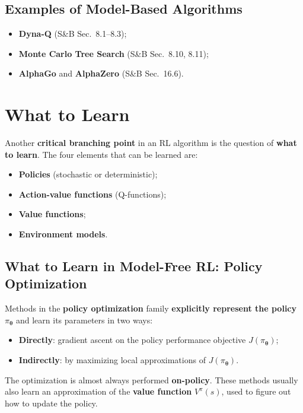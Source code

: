 \documentclass[11pt,a4paper]{article}
\theoremstyle{definition}
\theoremstyle{plain}
\theoremstyle{remark}
\begin{document}
\subsection{Examples of Model-Based Algorithms}

\begin{itemize}
    \item \textbf{Dyna-Q} (S\&B Sec.\ 8.1--8.3);
    \item \textbf{Monte Carlo Tree Search} (S\&B Sec.\ 8.10, 8.11);
    \item \textbf{AlphaGo} and \textbf{AlphaZero} (S\&B Sec.\ 16.6).
\end{itemize}

\section{What to Learn}

Another \textbf{critical branching point} in an RL algorithm is the question of \textbf{what to learn}. The four elements that can be learned are:
\begin{itemize}
    \item \textbf{Policies} (stochastic or deterministic);
    \item \textbf{Action-value functions} (Q-functions);
    \item \textbf{Value functions};
    \item \textbf{Environment models}.
\end{itemize}

\subsection{What to Learn in Model-Free RL: Policy Optimization}

Methods in the \textbf{policy optimization} family \textbf{explicitly represent the policy} $\pi_{\boldsymbol{\theta}}$ and learn its parameters in two ways:
\begin{itemize}
    \item \textbf{Directly}: gradient ascent on the policy performance objective $J(\pi_{\boldsymbol{\theta}})$;
    \item \textbf{Indirectly}: by maximizing local approximations of $J(\pi_{\boldsymbol{\theta}})$.
\end{itemize}
The optimization is almost always performed \textbf{on-policy}. These methods usually also learn an approximation of the \textbf{value function} $V^\pi(s)$, used to figure out how to update the policy.
\end{document}
